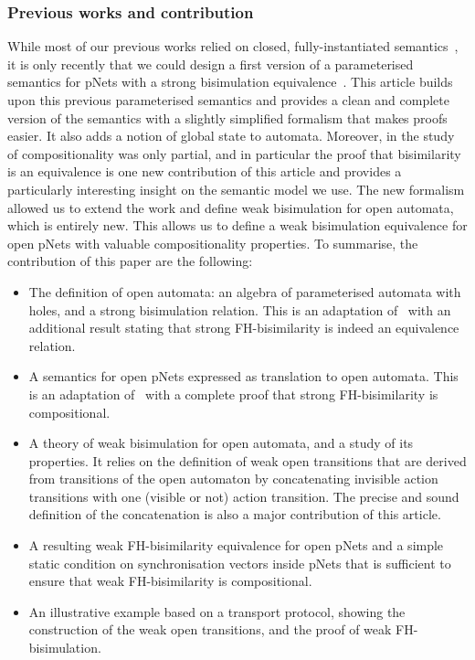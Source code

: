 \documentclass{elsarticle}
\begin{document}
\subsubsection*{Previous works and contribution}
While most of our previous works relied on closed, fully-instantiated semantics~\cite{BBCHM:article2008,AmeurBoulifa2017,HenrioKSM:2016}, it is only recently that we could design a first version of a  parameterised semantics for pNets with a strong bisimulation equivalence~\cite{henrio:Forte2016}. This article builds upon this previous parameterised semantics and provides a clean and complete version of the semantics with a slightly simplified formalism that makes proofs easier. It also adds a notion of global state to automata.  Moreover, in \cite{henrio:Forte2016} the study of compositionality was only partial, and in particular the proof that bisimilarity is an equivalence is one new contribution of this article and provides a particularly interesting insight on the semantic model we use.
The new formalism allowed us to extend the work and define weak bisimulation  for open automata, which is entirely new. This allows us to define a weak bisimulation equivalence for open pNets with valuable compositionality properties. 
To summarise, the contribution of this paper are the following:
\begin{itemize}
\item The definition of open automata: an algebra of parameterised automata with holes, and a strong bisimulation relation. This is an adaptation of~\cite{henrio:Forte2016} with an additional result stating that strong FH-bisimilarity is indeed an equivalence relation.
\item A semantics for open pNets expressed as translation to open automata. This is an adaptation of~\cite{henrio:Forte2016} with a complete proof that strong FH-bisimilarity is compositional.
\item A theory of weak bisimulation for open automata, and a study of its properties. It relies on the definition of weak open transitions that are derived from transitions of the open automaton by concatenating invisible action transitions with one (visible or not) action transition. The precise and sound definition of the concatenation is also a major contribution of this article.
\item A resulting weak FH-bisimilarity equivalence for open pNets and a simple static condition on synchronisation vectors inside pNets that is sufficient to ensure that weak FH-bisimilarity is compositional.
\item An illustrative example based on a  transport protocol, showing the construction of the weak open transitions, and the proof of weak FH-bisimulation.
\end{itemize}
\end{document}
